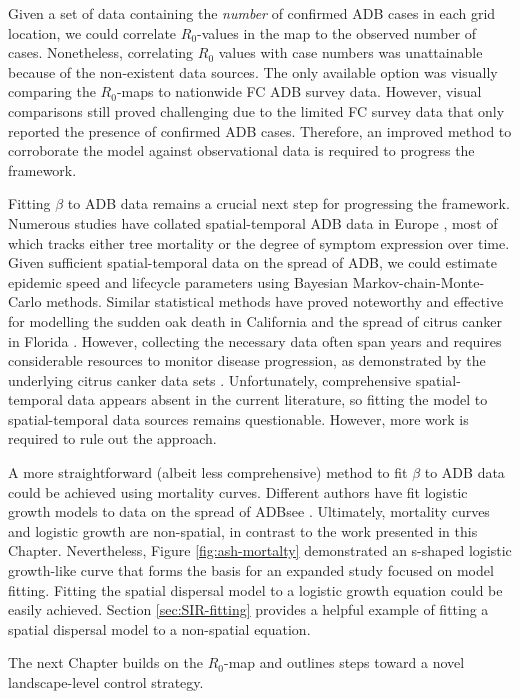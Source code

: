 Given a set of data containing the \textit{number} of confirmed ADB cases in each grid location, we could correlate $R_0$-values in the map to the observed number of cases. Nonetheless, correlating $R_0$ values with case numbers was unattainable because of the non-existent data sources. The only available option was visually comparing the $R_0$-maps to nationwide FC ADB survey data. However, visual comparisons still proved challenging due to the limited FC survey data that only reported the presence of confirmed ADB cases. Therefore, an improved method to corroborate the model against observational data is required to progress the framework.

Fitting $\beta$ to ADB data remains a crucial next step for progressing the framework. Numerous studies have collated spatial-temporal ADB data in Europe \cite{https://doi.org/10.1111/1365-2745.13383, https://doi.org/10.1002/ppp3.11, stocks2017first, lohmus2014ash}, most of which tracks either tree mortality or the degree of symptom expression over time. Given sufficient spatial-temporal data on the spread of ADB, we could estimate epidemic speed and lifecycle parameters using Bayesian Markov-chain-Monte-Carlo methods. Similar statistical methods have proved noteworthy and effective for modelling the sudden oak death in California \cite{10.1371/journal.pcbi.1002328} and the spread of citrus canker in Florida \cite{neri2014bayesian}. However, collecting the necessary data often span years and requires considerable resources to monitor disease progression, as demonstrated by the underlying citrus canker data sets \cite{gottwald2002geo}. Unfortunately, comprehensive spatial-temporal data appears absent in the current literature, so fitting the model to spatial-temporal data sources remains questionable. However, more work is required to rule out the approach.

A more straightforward (albeit less comprehensive) method to fit $\beta$ to ADB data could be achieved using mortality curves. Different authors have fit logistic growth models to data on the spread of ADB\textemdash see \cite{alonso2015designing, https://doi.org/10.1002/ppp3.11, lohmus2014ash}. Ultimately, mortality curves and logistic growth are non-spatial, in contrast to the work presented in this Chapter. Nevertheless, Figure \ref{fig:ash-mortalty} demonstrated an s-shaped logistic growth-like curve that forms the basis for an expanded study focused on model fitting. Fitting the spatial dispersal model to a logistic growth equation could be easily achieved. Section \ref{sec:SIR-fitting} provides a helpful example of fitting a spatial dispersal model to a non-spatial equation.

The next Chapter builds on the $R_0$-map and outlines steps toward a novel landscape-level control strategy.